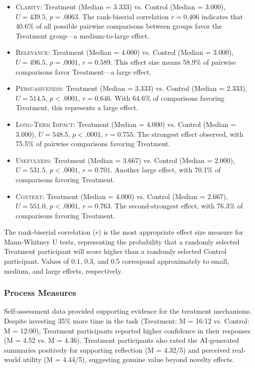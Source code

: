 \begin{itemize}
  \item \textsc{Clarity}: Treatment (Median = 3.333) vs. Control (Median = 3.000), $U = 439.5$, $p = .0063$. The rank-biserial correlation $r = 0.406$ indicates that 40.6\% of all possible pairwise comparisons between groups favor the Treatment group—a medium-to-large effect.

  \item \textsc{Relevance}: Treatment (Median = 4.000) vs. Control (Median = 3.000), $U = 496.5$, $p = .0001$, $r = 0.589$. This effect size means 58.9\% of pairwise comparisons favor Treatment—a large effect.

  \item \textsc{Persuasiveness}: Treatment (Median = 3.333) vs. Control (Median = 2.333), $U = 514.5$, $p < .0001$, $r = 0.646$. With 64.6\% of comparisons favoring Treatment, this represents a large effect.

  \item \textsc{Long-Term Impact}: Treatment (Median = 4.000) vs. Control (Median = 3.000), $U = 548.5$, $p < .0001$, $r = 0.755$. The strongest effect observed, with 75.5\% of pairwise comparisons favoring Treatment.

  \item \textsc{Usefulness}: Treatment (Median = 3.667) vs. Control (Median = 2.000), $U = 531.5$, $p < .0001$, $r = 0.701$. Another large effect, with 70.1\% of comparisons favoring Treatment.

  \item \textsc{Context}: Treatment (Median = 4.000) vs. Control (Median = 2.667), $U = 551.0$, $p < .0001$, $r = 0.763$. The second-strongest effect, with 76.3\% of comparisons favoring Treatment.
\end{itemize}

The rank-biserial correlation ($r$) is the most appropriate effect size measure for Mann-Whitney U tests, representing the probability that a randomly selected Treatment participant will score higher than a randomly selected Control participant. Values of 0.1, 0.3, and 0.5 correspond approximately to small, medium, and large effects, respectively.

\subsubsection{Process Measures}

Self-assessment data provided supporting evidence for the treatment mechanisms. Despite investing 35\% more time in the task (Treatment: M = 16:12 vs. Control: M = 12:00), Treatment participants reported higher confidence in their responses (M = 4.52 vs. M = 4.36). Treatment participants also rated the AI-generated summaries positively for supporting reflection (M = 4.32/5) and perceived real-world utility (M = 4.44/5), suggesting genuine value beyond novelty effects.

